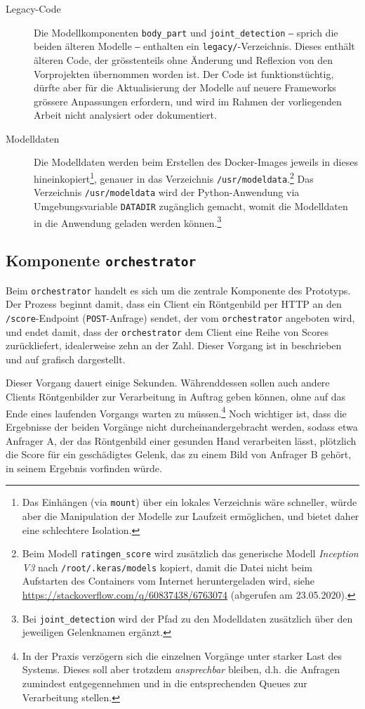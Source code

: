 \begin{description}
    \item[Legacy-Code] Die Modellkomponenten \texttt{body\_part} und \texttt{joint\_detection} ‒ sprich die beiden älteren Modelle ‒ enthalten ein \texttt{legacy/}-Verzeichnis. Dieses enthält älteren Code, der grösstenteils ohne Änderung und Reflexion von den Vorprojekten übernommen worden ist. Der Code ist funktionstüchtig, dürfte aber für die Aktualisierung der Modelle auf neuere Frameworks grössere Anpassungen erfordern, und wird im Rahmen der vorliegenden Arbeit nicht analysiert oder dokumentiert.
    \item[Modelldaten] Die Modelldaten werden beim Erstellen des Docker-Images jeweils in dieses hineinkopiert\footnote{Das Einhängen (via \texttt{mount}) über ein lokales Verzeichnis wäre schneller, würde aber die Manipulation der Modelle zur Laufzeit ermöglichen, und bietet daher eine schlechtere Isolation.}, genauer in das Verzeichnis \texttt{/usr/modeldata}.\footnote{Beim Modell \texttt{ratingen\_score} wird zusätzlich das generische Modell \textit{Inception V3} nach \texttt{/root/.keras/models} kopiert, damit die Datei nicht beim Aufstarten des Containers vom Internet heruntergeladen wird, siehe \url{https://stackoverflow.com/q/60837438/6763074} (abgerufen am 23.05.2020).} Das Verzeichnis \texttt{/usr/modeldata} wird der Python-Anwendung via Umgebungsvariable \texttt{DATADIR} zugänglich gemacht, womit die Modelldaten in die Anwendung geladen werden können.\footnote{Bei \texttt{joint\_detection} wird der Pfad zu den Modelldaten zusätzlich über den jeweiligen Gelenknamen ergänzt.}
\end{description}

\subsection{Komponente \texttt{orchestrator}}

Beim \texttt{orchestrator} handelt es sich um die zentrale Komponente des Prototyps. Der Prozess beginnt damit, dass ein Client ein Röntgenbild per HTTP an den \texttt{/score}-Endpoint (\texttt{POST}-Anfrage) sendet, der vom \texttt{orchestrator} angeboten wird, und endet damit, dass der \texttt{orchestrator} dem Client eine Reihe von Scores zurückliefert, idealerweise zehn an der Zahl. Dieser Vorgang ist in  beschrieben und auf  grafisch dargestellt.

Dieser Vorgang dauert einige Sekunden. Währenddessen sollen auch andere Clients Röntgenbilder zur Verarbeitung in Auftrag geben können, ohne auf das Ende eines laufenden Vorgangs warten zu müssen.\footnote{In der Praxis verzögern sich die einzelnen Vorgänge unter starker Last des Systems. Dieses soll aber trotzdem \textit{ansprechbar} bleiben, d.h. die Anfragen zumindest entgegennehmen und in die entsprechenden Queues zur Verarbeitung stellen.} Noch wichtiger ist, dass die Ergebnisse der beiden Vorgänge nicht durcheinandergebracht werden, sodass etwa Anfrager A, der das Röntgenbild einer gesunden Hand verarbeiten lässt, plötzlich die Score für ein geschädigtes Gelenk, das zu einem Bild von Anfrager B gehört, in seinem Ergebnis vorfinden würde.

